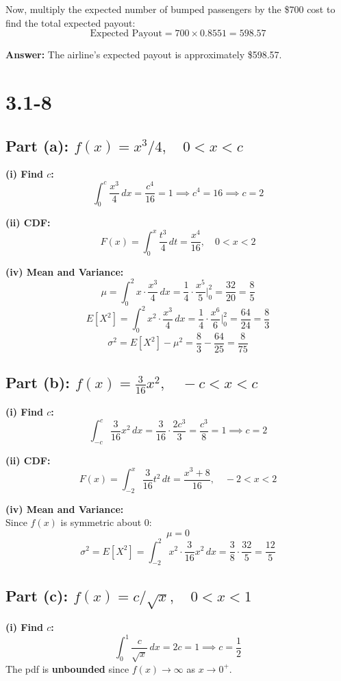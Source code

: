 Now, multiply the expected number of bumped passengers by the \$700 cost to find the total expected payout:
$$\text{Expected Payout} = 700 \times 0.8551 = 598.57$$

\textbf{Answer:} The airline's expected payout is approximately \$598.57.
\section*{3.1-8}
\subsection*{Part (a): $f(x) = x^3/4,\quad 0 < x < c$}

\noindent\textbf{(i) Find $c$:}
\[
\int_0^c \frac{x^3}{4}\,dx = \frac{c^4}{16} = 1 \implies c^4 = 16 \implies c = 2
\]

\noindent\textbf{(ii) CDF:}
\[
F(x) = \int_0^x \frac{t^3}{4}\,dt = \frac{x^4}{16}, \quad 0 < x < 2
\]

\noindent\textbf{(iv) Mean and Variance:}
\[
\mu = \int_0^2 x \cdot \frac{x^3}{4}\,dx = \frac{1}{4}\cdot\frac{x^5}{5}\Bigg|_0^2 = \frac{32}{20} = \frac{8}{5}
\]
\[
E[X^2] = \int_0^2 x^2 \cdot \frac{x^3}{4}\,dx = \frac{1}{4}\cdot\frac{x^6}{6}\Bigg|_0^2 = \frac{64}{24} = \frac{8}{3}
\]
\[
\sigma^2 = E[X^2] - \mu^2 = \frac{8}{3} - \frac{64}{25} = \frac{8}{75}
\]

\subsection*{Part (b): $f(x) = \frac{3}{16}x^2,\quad -c < x < c$}

\noindent\textbf{(i) Find $c$:}
\[
\int_{-c}^{c} \frac{3}{16}x^2\,dx = \frac{3}{16}\cdot\frac{2c^3}{3} = \frac{c^3}{8} = 1 \implies c = 2
\]

\noindent\textbf{(ii) CDF:}
\[
F(x) = \int_{-2}^{x} \frac{3}{16}t^2\,dt = \frac{x^3 + 8}{16}, \quad -2 < x < 2
\]

\noindent\textbf{(iv) Mean and Variance:}\\
Since $f(x)$ is symmetric about 0:
\[
\mu = 0
\]
\[
\sigma^2 = E[X^2] = \int_{-2}^{2} x^2 \cdot \frac{3}{16}x^2\,dx = \frac{3}{8}\cdot\frac{32}{5} = \frac{12}{5}
\]

\subsection*{Part (c): $f(x) = c/\sqrt{x},\quad 0 < x < 1$}

\noindent\textbf{(i) Find $c$:}
\[
\int_0^1 \frac{c}{\sqrt{x}}\,dx = 2c = 1 \implies c = \frac{1}{2}
\]
The pdf is \textbf{unbounded} since $f(x) \to \infty$ as $x \to 0^+$.

